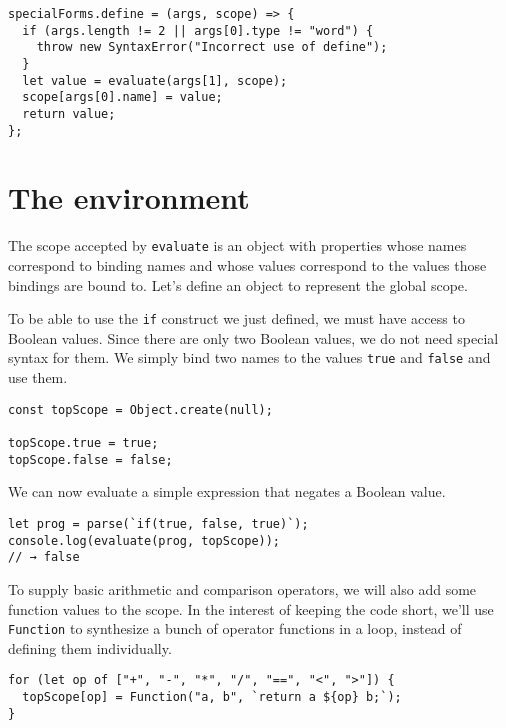\begin{lstlisting}
specialForms.define = (args, scope) => {
  if (args.length != 2 || args[0].type != "word") {
    throw new SyntaxError("Incorrect use of define");
  }
  let value = evaluate(args[1], scope);
  scope[args[0].name] = value;
  return value;
};
\end{lstlisting}
\noindent

\section{The environment}

The scope accepted by \lstinline`evaluate` is an object with properties whose names correspond to binding names and whose values correspond to the values those bindings are bound to. Let's define an object to represent the global scope.

To be able to use the \lstinline`if` construct we just defined, we must have access to Boolean values. Since there are only two Boolean values, we do not need special syntax for them. We simply bind two names to the values \lstinline`true` and \lstinline`false` and use them.

\begin{lstlisting}
const topScope = Object.create(null);

topScope.true = true;
topScope.false = false;
\end{lstlisting}
\noindent

We can now evaluate a simple expression that negates a Boolean value.

\begin{lstlisting}
let prog = parse(`if(true, false, true)`);
console.log(evaluate(prog, topScope));
// → false
\end{lstlisting}
\noindent{}

To supply basic arithmetic and comparison operators, we will also add some function values to the scope. In the interest of keeping the code short, we'll use \lstinline`Function` to synthesize a bunch of operator functions in a loop, instead of defining them individually.

\begin{lstlisting}
for (let op of ["+", "-", "*", "/", "==", "<", ">"]) {
  topScope[op] = Function("a, b", `return a ${op} b;`);
}
\end{lstlisting}
\noindent

